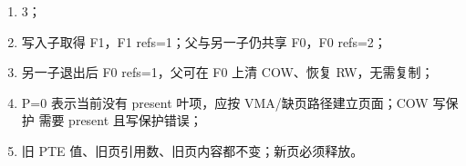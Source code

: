 \begin{answerbox}
\begin{enumerate}[leftmargin=2.2em]
  \item 3；
  \item 写入子取得 F1，F1 refs=1；父与另一子仍共享 F0，F0 refs=2；
  \item 另一子退出后 F0 refs=1，父可在 F0 上清 COW、恢复 RW，无需复制；
  \item P=0 表示当前没有 present 叶项，应按 VMA/缺页路径建立页面；COW 写保护
    需要 present 且写保护错误；
  \item 旧 PTE 值、旧页引用数、旧页内容都不变；新页必须释放。
\end{enumerate}
\end{answerbox}
